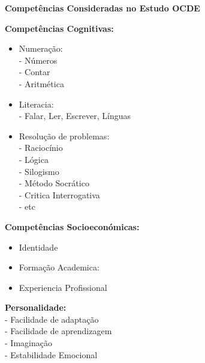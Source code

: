 \begin{center}\textbf{\Large Competências Consideradas no Estudo OCDE}
\end{center}
\begin{minipage}[t]{.5\linewidth}
\qquad \textbf{Competências Cognitivas:}
\begin{itemize}
\setlength\itemsep{-1em}
\item Numeração:\\
- Números\\
- Contar\\
- Aritmética\\
\item Literacia:\\
- Falar, Ler, Escrever, Línguas\\
\item Resolução de problemas:\\
- Raciocínio\\
- Lógica\\
- Silogismo\\
- Método Socrático\\
- Critica Interrogativa\\
- etc
\end{itemize}
\qquad \textbf{Competências Socioeconómicas:}
\begin{itemize}
\setlength\itemsep{-1em}
\item Identidade\\
\item Formação Academica:\\
\item Experiencia Profissional
\end{itemize}
\qquad \textbf{Personalidade:}\\
\hspace*{1cm}- Facilidade de adaptação\\
\hspace*{1cm}- Facilidade de aprendizagem\\
\hspace*{1cm}- Imaginação\\
\hspace*{1cm}- Estabilidade Emocional\\
\end{minipage}
